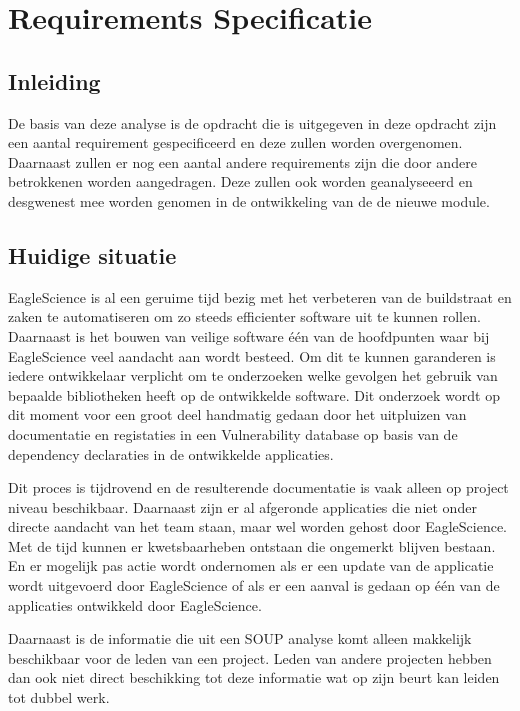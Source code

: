
\chapter{Requirements Specificatie}\label{ch:requirements-specificatie}


\section{Inleiding}\label{sec:RS_inleiding}
De basis van deze analyse is de opdracht die is uitgegeven in deze opdracht zijn een aantal requirement gespecificeerd en deze zullen worden overgenomen. Daarnaast zullen er nog een aantal andere requirements zijn die door andere betrokkenen worden aangedragen. Deze zullen ook worden geanalyseeerd en desgwenest mee worden genomen in de ontwikkeling van de de nieuwe module.

\section{Huidige situatie}\label{sec:huidige-situatie}
EagleScience is al een geruime tijd bezig met het verbeteren van de buildstraat en zaken te automatiseren om zo steeds efficienter software uit te kunnen rollen. Daarnaast is het bouwen van veilige software één van de hoofdpunten waar bij EagleScience veel aandacht aan wordt besteed. Om dit te kunnen garanderen is iedere ontwikkelaar verplicht om te onderzoeken welke gevolgen het gebruik van bepaalde bibliotheken heeft op de ontwikkelde software. Dit onderzoek wordt op dit moment voor een groot deel handmatig gedaan door het uitpluizen van documentatie en registaties in een Vulnerability database op basis van de dependency declaraties in de ontwikkelde applicaties.

Dit proces is tijdrovend en de resulterende documentatie is vaak alleen op project niveau beschikbaar. Daarnaast zijn er al afgeronde applicaties die niet onder directe aandacht van het team staan, maar wel worden gehost door EagleScience. Met de tijd kunnen er kwetsbaarheben ontstaan die ongemerkt blijven bestaan. En er mogelijk pas actie wordt ondernomen als er een update van de applicatie wordt uitgevoerd door EagleScience of als er een aanval is gedaan op één van de applicaties ontwikkeld door EagleScience.

Daarnaast is de informatie die uit een SOUP analyse komt alleen makkelijk beschikbaar voor de leden van een project. Leden van andere projecten hebben dan ook niet direct beschikking tot deze informatie wat op zijn beurt kan leiden tot dubbel werk.

